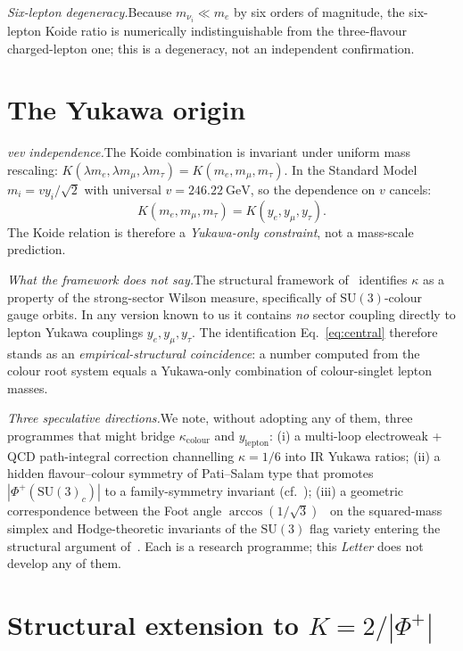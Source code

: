 \documentclass[aps,prl,reprint,amsmath,amssymb,nofootinbib,floatfix,superscriptaddress]{revtex4-2}
\newcommand{\SU}{\mathrm{SU}}
\newcommand{\Phiroots}{\Phi^{+}}
\begin{document}
\textit{Six-lepton degeneracy.}\quad Because $m_{\nu_i} \ll m_e$ by six orders of magnitude, the six-lepton Koide ratio is numerically indistinguishable from the three-flavour charged-lepton one; this is a degeneracy, not an independent confirmation.

\section{The Yukawa origin}
\label{sec:yukawa}

\textit{vev independence.}\quad The Koide combination is invariant under uniform mass rescaling: $K(\lambda m_e, \lambda m_\mu, \lambda m_\tau) = K(m_e, m_\mu, m_\tau)$. In the Standard Model $m_i = v y_i / \sqrt{2}$ with universal $v = 246.22~\mathrm{GeV}$, so the dependence on $v$ cancels:
\begin{equation*}
K(m_e, m_\mu, m_\tau) = K(y_e, y_\mu, y_\tau).
\end{equation*}
The Koide relation is therefore a \emph{Yukawa-only constraint}, not a mass-scale prediction.

\textit{What the framework does \emph{not} say.}\quad The structural framework of~\cite{Remondiere2026a,Remondiere2026b} identifies $\kappa$ as a property of the strong-sector Wilson measure, specifically of $\SU(3)$-colour gauge orbits. In any version known to us it contains \emph{no} sector coupling directly to lepton Yukawa couplings $y_e, y_\mu, y_\tau$. The identification Eq.~\eqref{eq:central} therefore stands as an \emph{empirical-structural coincidence}: a number computed from the colour root system equals a Yukawa-only combination of colour-singlet lepton masses.

\textit{Three speculative directions.}\quad We note, without adopting any of them, three programmes that might bridge $\kappa_{\mathrm{colour}}$ and $y_{\mathrm{lepton}}$:
(i) a multi-loop electroweak + QCD path-integral correction channelling $\kappa = 1/6$ into IR Yukawa ratios; (ii) a hidden flavour--colour symmetry of Pati--Salam type that promotes $|\Phiroots(\SU(3)_c)|$ to a family-symmetry invariant (cf.~\cite{Sumino2009a,Sumino2009b}); (iii) a geometric correspondence between the Foot angle $\arccos(1/\sqrt{3})$~\cite{Foot1994} on the squared-mass simplex and Hodge-theoretic invariants of the $\SU(3)$ flag variety entering the structural argument of~\cite{Remondiere2026b}. Each is a research programme; this \textit{Letter} does not develop any of them.

\section{Structural extension to $K = 2/|\Phiroots|$}
\label{sec:extension}
\end{document}
